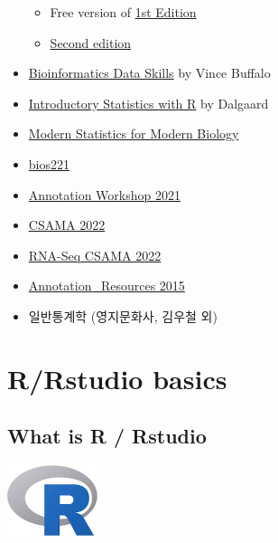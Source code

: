 \documentclass[
]{book}
\providecommand{\tightlist}{%
  \setlength{\itemsep}{0pt}\setlength{\parskip}{0pt}}
\begin{document}
\begin{itemize}
  \begin{itemize}
  \tightlist
  \item
    Free version of \href{https://cran.r-project.org/doc/contrib/Verzani-SimpleR.pdf}{1st Edition}
  \item
    \href{https://www.crcpress.com/Using-R-for-Introductory-Statistics-Second-Edition/Verzani/p/book/9781466590731}{Second edition}
  \end{itemize}
\item
  \href{http://2.droppdf.com/files/5aTvl/bioinformatics-data-skills.pdf}{Bioinformatics Data Skills} by Vince Buffalo
\item
  \href{http://www.academia.dk/BiologiskAntropologi/Epidemiologi/PDF/Introductory_Statistics_with_R__2nd_ed.pdf}{Introductory Statistics with R} by Dalgaard
\item
  \href{http://web.stanford.edu/class/bios221/book/index.html}{Modern Statistics for Modern Biology}
\item
  \href{https://web.stanford.edu/class/bios221/labs/}{bios221}
\item
  \href{https://jmacdon.github.io/Bioc2021Anno/articles/AnnotationWorkshop.html\#summarizedexperiment-objects-1}{Annotation Workshop 2021}
\item
  \href{https://www.bioconductor.org/help/course-materials/2022/CSAMA/}{CSAMA 2022}
\item
  \href{https://www.bioconductor.org/help/course-materials/2022/CSAMA/lab/2-tuesday/lab-03-rnaseq/rnaseqGene_CSAMA2022.html}{RNA-Seq CSAMA 2022}
\item
  \href{https://bioconductor.org/help/course-materials/2015/BioC2015/Annotation_Resources.html}{Annotation\_Resources 2015}
\item
  일반통계학 (영지문화사, 김우철 외)
\end{itemize}

\hypertarget{rrstudio-basics}{%
\chapter{R/Rstudio basics}\label{rrstudio-basics}}

\hypertarget{what-is-r-rstudio}{%
\section{What is R / Rstudio}\label{what-is-r-rstudio}}

\includegraphics[width=1.04167in,height=\textheight]{images/01/r.jpg}
\end{document}
